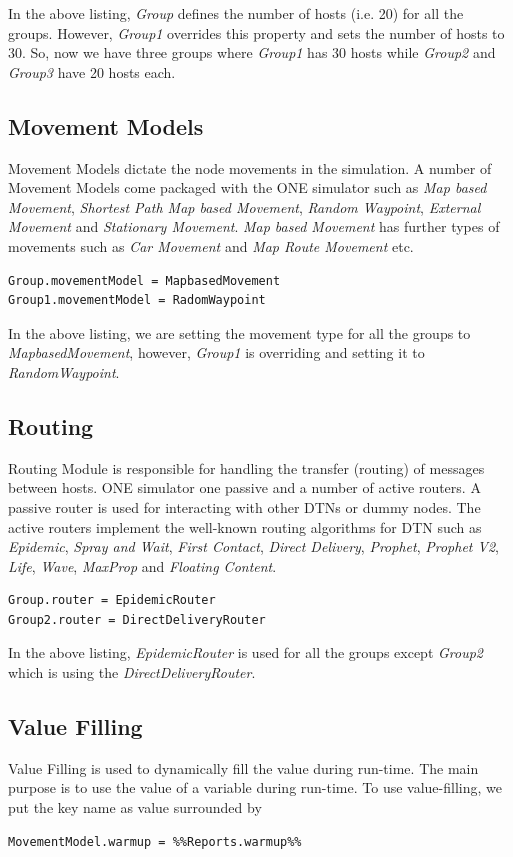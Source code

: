 In the above listing, \textit{Group} defines the number of hosts (i.e. 20) for all the groups. However, \textit{Group1} overrides this property and sets the number of hosts to 30. So, now we have three groups where \textit{Group1} has 30 hosts while \textit{Group2} and \textit{Group3} have 20 hosts each.

\subsection{Movement Models}
Movement Models dictate the node movements in the simulation. A number of Movement Models come packaged with the ONE simulator such as \textit{Map based Movement}, \textit{Shortest Path Map based Movement}, \textit{Random Waypoint}, \textit{External Movement} and \textit{Stationary Movement}. \textit{Map based Movement} has further types of movements such as \textit{Car Movement} and \textit{Map Route Movement} etc.
\begin{lstlisting}[language=bash]
Group.movementModel = MapbasedMovement
Group1.movementModel = RadomWaypoint
\end{lstlisting}

In the above listing, we are setting the movement type for all the groups to \textit{MapbasedMovement}, however, \textit{Group1} is overriding and setting it to \textit{RandomWaypoint}.

\subsection{Routing}
Routing Module is responsible for handling the transfer (routing) of messages between hosts. ONE simulator one passive and a number of active routers. A passive router is used for interacting with other DTNs or dummy nodes. The active routers implement the well-known routing algorithms for DTN such as \textit{Epidemic}, \textit{Spray and Wait}, \textit{First Contact}, \textit{Direct Delivery}, \textit{Prophet}, \textit{Prophet V2}, \textit{Life}, \textit{Wave}, \textit{MaxProp} and \textit{Floating Content}.
\begin{lstlisting}[language=bash]
Group.router = EpidemicRouter
Group2.router = DirectDeliveryRouter
\end{lstlisting}

In the above listing, \textit{EpidemicRouter} is used for all the groups except \textit{Group2} which is using the \textit{DirectDeliveryRouter}.


\subsection{Value Filling}
Value Filling is used to dynamically fill the value during run-time. The main purpose is to use the value of a variable during run-time. To use value-filling, we put the key name as value surrounded by %
\begin{lstlisting}[language=bash]
MovementModel.warmup = %%Reports.warmup%%
\end{lstlisting}

